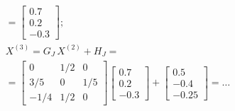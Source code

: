 \documentclass[CN_A-Tests_Resolutions.tex]{subfiles}
\begin{document}
\begin{questionBox}
\begin{gather*}
    =\begin{bmatrix}
      0.7\\0.2\\-0.3
    \end{bmatrix}
    ; \\[1ex]
    X^{(3)}
    =G_J\,X^{(2)}+H_J
    = \\
    =\begin{bmatrix}
      0 & 1/2 & 0
      \\ 3/5 & 0 & 1/5
      \\ -1/4 & 1/2 & 0
    \end{bmatrix}
    \begin{bmatrix}
      0.7\\0.2\\-0.3
    \end{bmatrix}
    + \begin{bmatrix}
      0.5\\-0.4\\-0.25
    \end{bmatrix}
    =\dots
  \end{gather*}

\end{questionBox}
\end{document}
